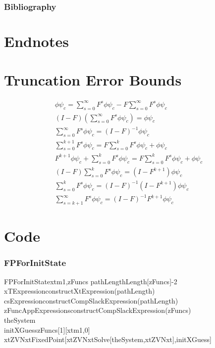 \documentclass{beamer}
\begin{document}
  \begin{frame}
  	\frametitle{Bibliography}
  	

 
 
     
   \end{frame}


      \section{Endnotes}
 \label{sec:endnotes}
 {\tiny
      \theendnotes
 }




\appendix
\newpage
\section{Truncation Error Bounds}
{\tiny
\begin{gather*}
\phi \psi_c=  \sum_{s=0}^\infty F^s \phi \psi_c  -   F \sum_{s=0}^\infty F^s \phi \psi_c \\
(I-F) \left (\sum_{s=0}^\infty F^s \phi \psi_c \right ) =\phi \psi_c\\
\sum_{s=0}^\infty F^s \phi \psi_c=(I - F)^{-1}\phi \psi_c\\
\sum_{s=0}^{k+1} F^s \phi \psi_c=F \sum_{s=0}^{k} F^s \phi \psi_c + \phi \psi_c\\
F^{k+1} \phi \psi_c +\sum_{s=0}^{k} F^s \phi \psi_c=F \sum_{s=0}^{k} F^s \phi \psi_c + \phi \psi_c\\
(I -F)\sum_{s=0}^{k} F^s\phi \psi_c  = (I- F^{k+1}) \phi \psi_c\\
\sum_{s=0}^{k} F^s \phi \psi_c = (I -F)^{-1}(I- F^{k+1}) \phi \psi_c\\
\sum_{s=k+1}^{\infty} F^s \phi \psi_c = (I -F)^{-1} F^{k+1}\phi \psi_c
\end{gather*}
}
\section{Code}
\begin{frame}
\frametitle{FPForInitState}
\label{sec:code}

\begin{pseudocode}{FPForInitState}{xtm1,zFuncs}
pathLength\GETS Length[zFuncs]-2\\
xTExpression\GETS constructXtExpression(pathLength)\\
csExpression\GETS constructCompSlackExpression(pathLength)\\
zFuncAppExpressions\GETS constructCompSlackExpression(zFuncs)\\
theSystem\\
initXGuess\GETS zFuncs[1][xtm1,0]\\
xtZVNxt\GETS FixedPoint[xtZVNxt\GETS Solve[theSystem,xtZVNxt],initXGuess]\\
\end{pseudocode}
\end{frame}
\end{document}
